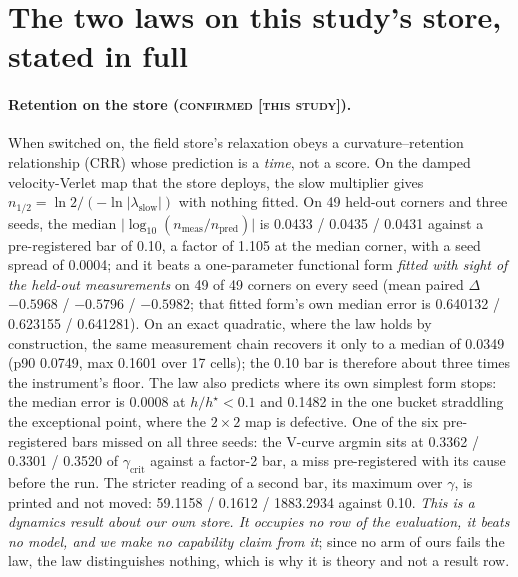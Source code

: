 \documentclass{article} %
\begin{document}
\section{The two laws on this study's store, stated in full}
\label{app:laws}

\paragraph{Retention on the store (\textsc{confirmed [this study]}).} When switched on, the field
store's relaxation obeys a curvature--retention relationship (CRR) whose prediction is a
\emph{time}, not a score. On the damped velocity-Verlet map that the store deploys, the slow
multiplier gives $n_{1/2}=\ln2/(-\ln\lvert\lambda_{\text{slow}}\rvert)$ with nothing fitted. On 49
held-out corners and three seeds, the median $\lvert\log_{10}(n_{\text{meas}}/n_{\text{pred}})\rvert$ is
0.0433 / 0.0435 / 0.0431 against a pre-registered bar of 0.10, a factor of 1.105 at the median
corner, with a seed spread of 0.0004; and it beats a one-parameter functional form \emph{fitted with sight
of the held-out measurements} on 49 of 49 corners on every seed (mean paired $\Delta$ $-0.5968$ /
$-0.5796$ / $-0.5982$; that fitted form's own median error is 0.640132 / 0.623155 / 0.641281).
On an exact quadratic, where the law holds by construction, the same measurement chain recovers it
only to a median of 0.0349 (p90 0.0749, max 0.1601 over 17 cells); the 0.10 bar is therefore about
three times the instrument's floor. %
The law also predicts where its own simplest form stops: the median error is 0.0008 at $h/h^\star<0.1$
and 0.1482 in the one bucket straddling the exceptional point, where the $2\times2$ map is
defective. %
One of the six pre-registered bars missed on all three seeds: the V-curve argmin sits at 0.3362 /
0.3301 / 0.3520 of $\gamma_{\text{crit}}$ against a factor-2 bar, a miss pre-registered with its
cause before the run. The stricter reading of a second bar, its maximum over $\gamma$, is
printed and not moved: 59.1158 / 0.1612 / 1883.2934 against 0.10.
\emph{This is a dynamics result about our own store. It occupies no row of the evaluation, it
beats no model, and we make no capability claim from it}; since no arm of ours fails the law, the
law distinguishes nothing, which is why it is theory and not a result row.
\end{document}
